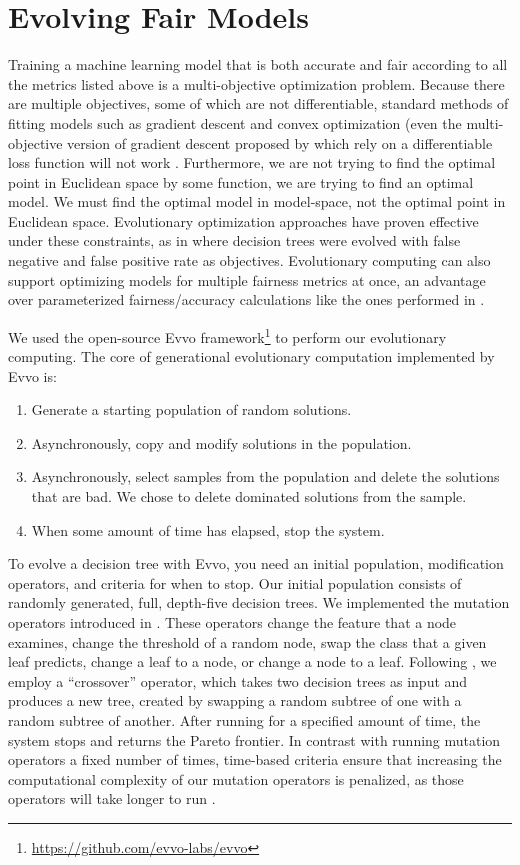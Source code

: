 \documentclass[twoside]{article}
\begin{document}
\section{Evolving Fair Models}
Training a machine learning model that is both accurate and fair according to all the metrics listed above is a multi-objective optimization problem. Because there are multiple objectives, some of which are not differentiable, standard methods of fitting models such as gradient descent and convex optimization (even the multi-objective version of gradient descent proposed by \citep{Desideri:2012} which rely on a differentiable loss function will not work \citep{Zerbinati:2011}. Furthermore, we are not trying to find the optimal point in Euclidean space by some function, we are trying to find an optimal model. We must find the optimal model in model-space, not the optimal point in Euclidean space. Evolutionary optimization approaches have proven effective under these constraints, as in \citep{Zhao:2007} where decision trees were evolved with false negative and false positive rate as objectives. Evolutionary computing can also support optimizing models for multiple fairness metrics at once, an advantage over parameterized fairness/accuracy calculations like the ones performed in \citep{Friedler:2019}. 

We used the open-source Evvo framework\footnote{\href{https://github.com/evvo-labs/evvo}{https://github.com/evvo-labs/evvo}} to perform our evolutionary computing. The core of generational evolutionary computation implemented by Evvo is:

\begin{enumerate}
	\item Generate a starting population of random solutions.
	\item Asynchronously, copy and modify solutions in the population.
	\item Asynchronously, select samples from the population and delete the solutions that are bad. We chose to delete dominated solutions from the sample.
	\item When some amount of time has elapsed, stop the system.
\end{enumerate}

To evolve a decision tree with Evvo, you need an initial population, modification operators, and criteria for when to stop. Our initial population consists of randomly generated, full, depth-five decision trees. We implemented the mutation operators introduced in \citep{Kretowski:2005}. These operators change the feature that a node examines, change the threshold of a random node, swap the class that a given leaf predicts, change a leaf to a node, or change a node to a leaf. Following \citep{Papagelis:2000}, we employ a “crossover” operator, which takes two decision trees as input and produces a new tree, created by swapping a random subtree of one with a random subtree of another. After running for a specified amount of time, the system stops and returns the Pareto frontier. In contrast with running mutation operators a fixed number of times, time-based criteria ensure that increasing the computational complexity of our mutation operators is penalized, as those operators will take longer to run \citep{Eiben:2015}.
\end{document}
